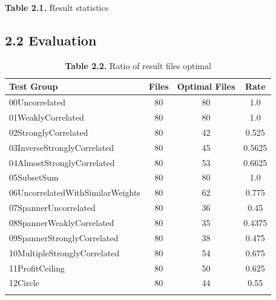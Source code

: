 \documentclass[english, a4paper,12pt]{article}
\begin{document}
\begin{center}
\textbf{Table 2.1.} Result statistics
\end{center}
\newpage 
\restoregeometry

\subsection*{2.2 Evaluation}
\begin{table}[H]
\centering
\begin{tabular}{|lccc|}
\hline
\textbf{Test Group} & \textbf{Files} & \textbf{Optimal Files} & \textbf{Rate} \\
\hline
\addlinespace
\hline
00Uncorrelated & 80 & 80 & 1.0 \\
01WeaklyCorrelated & 80 & 80 & 1.0 \\
02StronglyCorrelated & 80 & 42 & 0.525 \\
03InverseStronglyCorrelated & 80 & 45 & 0.5625 \\
04AlmostStronglyCorrelated & 80 & 53 & 0.6625 \\
05SubsetSum & 80 & 80 & 1.0 \\
06UncorrelatedWithSimilarWeights & 80 & 62 & 0.775 \\
07SpannerUncorrelated & 80 & 36 & 0.45 \\
08SpannerWeaklyCorrelated & 80 & 35 & 0.4375 \\
09SpannerStronglyCorrelated & 80 & 38 & 0.475 \\
10MultipleStronglyCorrelated & 80 & 54 & 0.675 \\
11ProfitCeiling & 80 & 50 & 0.625 \\
12Circle & 80 & 44 & 0.55 \\
\hline
\addlinespace
\end{tabular}
\caption*{\textbf{Table 2.2.} Ratio of result files optimal }
\end{table}
\end{document}
